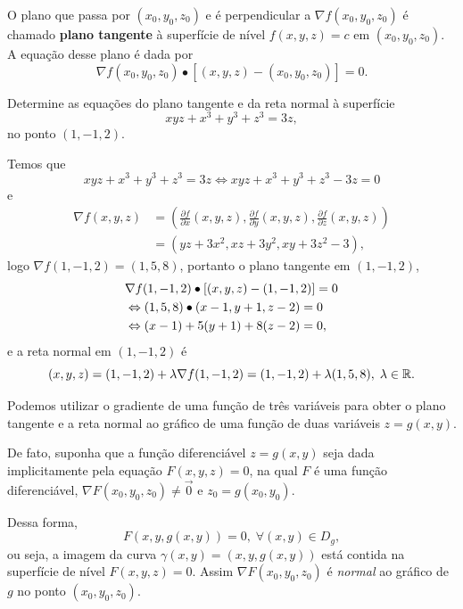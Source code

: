 \begin{definition}
    O plano que passa por \((x_0,y_0,z_0)\) e é perpendicular a \(\nabla f(x_0,y_0,z_0)\) é chamado \textbf{plano tangente} à superfície de nível \(f(x,y,z) = c\) em \((x_0,y_0,z_0)\). A equação desse plano é dada por \[\nabla f(x_0,y_0,z_0)\bullet[(x,y,z) - (x_0,y_0,z_0)] = 0.\]
\end{definition}

\begin{example}
    Determine as equações do plano tangente e da reta normal à superfície \[xyz + x^3 + y^3 + z^3 = 3z,\] no ponto \((1,-1,2)\).

    Temos que \[xyz + x^3 + y^3 + z^3 = 3z \Leftrightarrow xyz + x^3 + y^3 + z^3 - 3z = 0\] e
        \begin{align*}
            \nabla f(x,y,z) 
            & = \left( \frac{\partial f}{\partial x}(x,y,z), \frac{\partial f}{\partial y}(x,y,z), \frac{\partial f}{\partial z}(x,y,z) \right) \\
            & = (yz + 3x^2, xz + 3y^2, xy + 3z^2 - 3),
        \end{align*}
    logo \(\nabla f(1,-1,2) = (1,5,8)\), portanto o plano tangente em \((1,-1,2)\),
        \begin{align*}
            {\lefteqn{\nabla f(1,-1,2)\bullet[(x,y,z) - (1,-1,2)] = 0}} \\
            & \Leftrightarrow (1,5,8)\bullet(x-1,y+1,z-2) = 0 \\
            & \Leftrightarrow (x-1) + 5(y+1) + 8(z-2) = 0,
        \end{align*}
    e a reta normal em \((1,-1,2)\) é \[(x,y,z) = (1,-1,2) + \lambda \nabla f(1,-1,2) = (1,-1,2) + \lambda(1,5,8),\; \lambda\in\mathbb{R}.\]
\end{example}

\begin{remark}
    Podemos utilizar o gradiente de uma função de três variáveis para obter o plano tangente e a reta normal ao gráfico de uma função de duas variáveis \(z = g(x,y)\).

    De fato, suponha que a função diferenciável \(z = g(x,y)\) seja dada implicitamente pela equação \(F(x,y,z) = 0\), na qual \(F\) é uma função diferenciável, \(\nabla F(x_0,y_0,z_0) \neq \overrightarrow{0}\) e \(z_0 = g(x_0,y_0)\).

    Dessa forma, \[F(x,y,g(x,y)) = 0,\; \forall (x,y)\in D_g,\] ou seja, a imagem da curva \(\gamma(x,y) = (x,y,g(x,y))\) está contida na superfície de nível \(F(x,y,z) = 0\). Assim \(\nabla F(x_0,y_0,z_0)\) é \textit{normal} ao gráfico de \(g\) no ponto \((x_0,y_0,z_0)\).
\end{remark}

